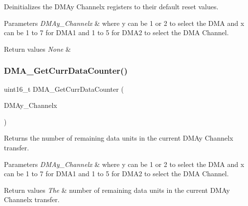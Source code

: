 Deinitializes the D\+M\+Ay Channelx registers to their default reset values. 


\begin{DoxyParams}{Parameters}
{\em D\+M\+Ay\+\_\+\+Channelx} & where y can be 1 or 2 to select the D\+MA and x can be 1 to 7 for D\+M\+A1 and 1 to 5 for D\+M\+A2 to select the D\+MA Channel. \\
\hline
\end{DoxyParams}

\begin{DoxyRetVals}{Return values}
{\em None} & \\
\hline
\end{DoxyRetVals}
\mbox{\label{group___d_m_a___exported___functions_ga511b4c402d1ff32d53f28736956cac5d}} 
\subsubsection{\texorpdfstring{DMA\_GetCurrDataCounter()}{DMA\_GetCurrDataCounter()}}
{\footnotesize\ttfamily uint16\+\_\+t D\+M\+A\+\_\+\+Get\+Curr\+Data\+Counter (\begin{DoxyParamCaption}\item[{\mbox{\hyperlink{struct_d_m_a___channel___type_def}{D\+M\+A\+\_\+\+Channel\+\_\+\+Type\+Def}} $\ast$}]{D\+M\+Ay\+\_\+\+Channelx }\end{DoxyParamCaption})}



Returns the number of remaining data units in the current D\+M\+Ay Channelx transfer. 


\begin{DoxyParams}{Parameters}
{\em D\+M\+Ay\+\_\+\+Channelx} & where y can be 1 or 2 to select the D\+MA and x can be 1 to 7 for D\+M\+A1 and 1 to 5 for D\+M\+A2 to select the D\+MA Channel. \\
\hline
\end{DoxyParams}

\begin{DoxyRetVals}{Return values}
{\em The} & number of remaining data units in the current D\+M\+Ay Channelx transfer. \\
\hline
\end{DoxyRetVals}
\mbox{\label{group___d_m_a___exported___functions_gafb30b7a891834c267eefd5d30b688a9f}} 

